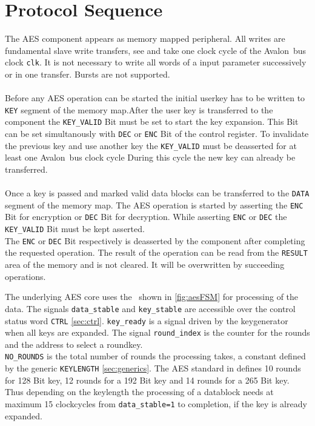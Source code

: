 \documentclass{ruschidoc}
\begin{document}
\section{Protocol Sequence}
\label{sec:usage}
The AES component appears as memory mapped peripheral. All writes are fundamental slave write transfers, see \cite{Altera:Avalon} and take one 
clock cycle of the Avalon\rtm\ bus clock \texttt{clk}. It is not necessary to write all words of a input parameter successively or in one transfer. 
Bursts are not supported.\\
\\
Before any AES operation can be started the initial userkey has to be written to
\texttt{KEY} segment of the memory map.After the user key is transferred
to the component the \texttt{KEY\_VALID} Bit must be set to start the key
expansion. This Bit can be set simultanously with \texttt{DEC} or \texttt{ENC} Bit of
the control register. To invalidate the previous key and use another key the
\texttt{KEY\_VALID} must be deasserted for at least one Avalon\rtm\ bus clock cycle
During this cycle the new key can already be transferred.\\
\\
Once a key is passed and marked valid data blocks can be transferred to the
\texttt{DATA} segment of the memory map. 
The AES operation is started by asserting the \texttt{ENC} Bit for
encryption or \texttt{DEC} Bit for decryption. 
While asserting \texttt{ENC} or \texttt{DEC} the \texttt{KEY\_VALID} Bit must be
kept asserted.\\ 
The \texttt{ENC} or \texttt{DEC} Bit respectively is deasserted by the component
after completing the requested operation.
The result of the operation can be read from the \texttt{RESULT} area of the memory
and is not cleared. It will be overwritten by succeeding operations. 

The underlying AES core uses the \FSM\ shown in \ref{fig:aesFSM} for processing of
the data. The signals \texttt{data\_stable} and \texttt{key\_stable} are accessible
over the control status word \texttt{CTRL} \ref{sec:ctrl}. \texttt{key\_ready} is a
signal driven by the keygenerator when all keys are expanded. The signal
\texttt{round\_index} is the counter for the rounds and the address to select a
roundkey. \\
\texttt{NO\_ROUNDS} is the total number of rounds the processing takes, a constant
defined by the generic \texttt{KEYLENGTH} \ref{sec:generics}. The AES standard
in\cite{NIST:Fips197} defines 10 rounds for 128 Bit key, 12 rounds for a 192 Bit key
and 14 rounds for a 265 Bit key.\\
Thus depending on the keylength the processing of a datablock needs at maximum 15
clockcycles from \texttt{data\_stable=1} to completion, if the key is already expanded.
\end{document}
